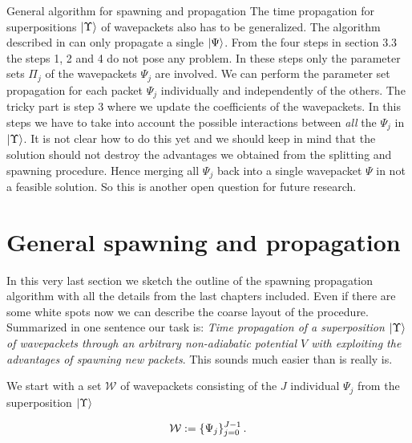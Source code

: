 \begin{chapter}{General algorithm for spawning and propagation}
The time propagation for superpositions $\Ket{\Upsilon}$ of wavepackets also has
to be generalized. The algorithm described in \cite{FGL_semiclassical_dynamics}
can only propagate a single $\Ket{\Psi}$. From the four steps in section 3.3 the
steps 1, 2 and 4 do not pose any problem. In these steps only the parameter
sets $\Pi_j$ of the wavepackets $\Psi_j$ are involved. We can perform the
parameter set propagation for each packet $\Psi_j$ individually and independently
of the others. The tricky part is step 3 where we update the coefficients of
the wavepackets. In this steps we have to take into account the possible interactions
between \emph{all} the $\Psi_j$ in $\Ket{\Upsilon}$. It is not clear how to do this
yet and we should keep in mind that the solution should not destroy the advantages
we obtained from the splitting and spawning procedure. Hence merging all $\Psi_j$
back into a single wavepacket $\Psi$ in not a feasible solution. So this is another
open question for future research.


\section{General spawning and propagation}

In this very last section we sketch the outline of the spawning propagation algorithm
with all the details from the last chapters included. Even if there are some white
spots now we can describe the coarse layout of the procedure. Summarized in one sentence
our task is: \emph{Time propagation of a superposition $\Ket{\Upsilon}$ of wavepackets
through an arbitrary non-adiabatic potential $V$ with exploiting the advantages
of spawning new packets}. This sounds much easier than is really is.

We start with a set $\mathcal{W}$ of wavepackets consisting of the $J$ individual
$\Psi_j$ from the superposition $\Ket{\Upsilon}$

\begin{equation}
  \mathcal{W} := \{\Psi_j\}_{j=0}^{J-1} \,.
\end{equation}


\end{chapter}
